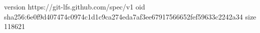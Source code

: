version https://git-lfs.github.com/spec/v1
oid sha256:6e0f9d407474c0974c1d1c9ca274eda7af3ee67917566652fef59633c2242a34
size 118621
